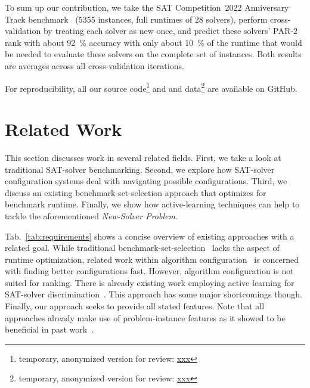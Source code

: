\documentclass[runningheads]{llncs}
\begin{document}
To sum up our contribution, we take the SAT Competition~2022 Anniversary Track benchmark~\cite{sat2022} (5355 instances, full runtimes of 28 solvers), perform cross-validation by treating each solver as new once, and predict these solvers' PAR-2 rank with about \SI{92}{\%} accuracy with only about \SI{10}{\%} of the runtime that would be needed to evaluate these solvers on the complete set of instances.
Both results are averages across all cross-validation iterations.

For reproducibility, all our source code\footnote{temporary, anonymized version for review: \url{xxx}} and and data\footnote{temporary, anonymized version for review: \url{xxx}} are available on GitHub.


\section{Related Work}
This section discusses work in several related fields.
First, we take a look at traditional SAT-solver benchmarking.
Second, we explore how SAT-solver configuration systems deal with navigating possible configurations.
Third, we discuss an existing benchmark-set-selection approach that optimizes for benchmark runtime.
Finally, we show how active-learning techniques can help to tackle the aforementioned \emph{New-Solver Problem}.

Tab.~\ref{tab:requirements} shows a concise overview of existing approaches with a related goal.
While traditional benchmark-set-selection~\cite{HoosKSS13} lacks the aspect of runtime optimization, related work within algorithm configuration~\cite{HutterHL11} is concerned with finding better configurations fast.
However, algorithm configuration is not suited for ranking.
There is already existing work employing active learning for SAT-solver discrimination~\cite{MatriconAFSH21}.
This approach has some major shortcomings though.
Finally, our approach seeks to provide all stated features.
Note that all approaches already make use of problem-instance features as it showed to be beneficial in past work~\cite{HoosKSS13,CollauttiMMO13,NgokoCT19}.
\end{document}
